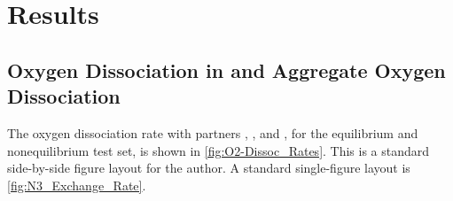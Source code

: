 \graphicspath{{./results/}}

\chapter{Results}
\label{sec:Results}

\section
   {Oxygen Dissociation in  and Aggregate Oxygen Dissociation}
\label{sec:O2_N2}
The oxygen dissociation rate with partners , , and , for the equilibrium and nonequilibrium test set,
   is shown in \cref{fig:O2-Dissoc_Rates}.
This is a standard side-by-side figure layout for the author.
A standard single-figure layout is \cref{fig:N3_Exchange_Rate}.

